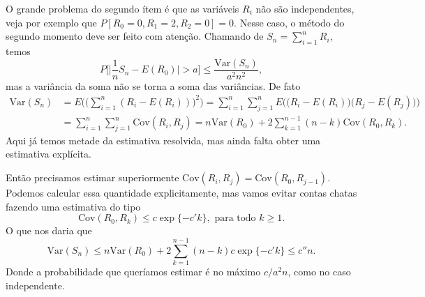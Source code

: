\documentclass[reqno, final]{book}
\newcommand*\1{\mathds{1}}
\begin{document}
O grande problema do segundo ítem é que as variáveis $R_i$ não são independentes, veja por exemplo que $P[R_0=0,R_1=2,R_2=0] = 0$.
Nesse caso, o método do segundo momento deve ser feito com atenção.
Chamando de $S_n = \sum_{i=1}^n R_i$, temos
\begin{equation}
  P \Big[ \Big| \frac{1}{n} S_n - E(R_0) \Big| > a \Big] \leq \frac{\text{Var}(S_n)}{a^2 n^2},
\end{equation}
mas a variância da soma não se torna a soma das variâncias.
De fato
\begin{equation}
  \begin{split}
    \text{Var}(S_n) & = E \Big( \big(\sum_{i=1}^n (R_i - E(R_i)) \big)^2\Big) = \sum_{i=1}^n \sum_{j=1}^n E \Big(\big(R_i - E(R_i)\big) \big(R_j - E(R_j) \big)\Big)\\
    & = \sum_{i=1}^n \sum_{j=1}^n \text{Cov}(R_i, R_j) = n \text{Var}(R_0) + 2 \sum_{k=1}^{n-1} (n-k) \text{Cov}(R_0, R_k).
  \end{split}
\end{equation}
Aqui já temos metade da estimativa resolvida, mas ainda falta obter uma estimativa explícita.

Então precisamos estimar superiormente $\text{Cov}(R_i, R_j) = \text{Cov}(R_0, R_{j-1})$.
Podemos calcular essa quantidade explicitamente, mas vamos evitar contas chatas fazendo uma estimativa do tipo
\begin{equation}
  \text{Cov}(R_0, R_k) \leq c \exp\{-c' k\}, \text{ para todo $k \geq 1$}.
\end{equation}
O que nos daria que
\begin{equation}
  \text{Var}(S_n) \leq n \text{Var}(R_0) + 2 \sum_{k=1}^{n-1} (n-k) c \exp\{-c' k\} \leq c'' n.
\end{equation}
Donde a probabilidade que queríamos estimar é no máximo ${c}/{a^2 n}$, como no caso independente.
\end{document}
